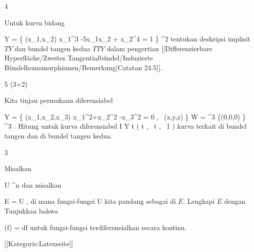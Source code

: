 {4}
{

Untuk kurva bidang

\mavergleichskettedisp
{\vergleichskette
{ Y
}
{ =} { \left\{ (x_1,x_2)  \mid   x_1^3 -5x_1x_2 + x_2^4 = 1         \right\}
}
{ \subset} { \R^2
}
{ } {
}
{ } {
}
}
{}{}{}
tentukan deskripsi implisit
$TY$ dan bundel tangen kedua $TTY$ dalam pengertian
[[Differenzierbare Hyperfläche/Zweites Tangentialbündel/Induzierte Bündelhomomorphismen/Bemerkung|Catatan 24.5]].

}
{} {}

{5 (3+2)}
{

Kita tinjau permukaan diferensiabel

\mavergleichskettedisp
{\vergleichskette
{ Y
}
{ =} { \left\{ (x_1,x_2,x_3)  \mid   x_1^2+x_2^2 -x_3^2 = 0  , \, (x,y,z)        \right\}
}
{ \subseteq} { W
}
{ =} { \R^3 \setminus \{(0,0,0) \}
}
{ \subset} { \R^3
}
}
{}{}{.}
 {Hitung untuk kurva diferensiabel
\maabbeledisp {} { I } { Y
} { t } { \left(  \cos  t   , \,   \sin  t  , \,   1                 \right)
} {}
kurva terkait di bundel tangen dan di bundel tangen kedua.
}

}
{} {}

{3}
{

Misalkan

\mavergleichskette
{\vergleichskette
{ U
}
{ \subseteq }{ \R^n
}
{  }{
}
{    }{
}
{   }{
}
}
{}{}{}
dan misalkan

\mavergleichskette
{\vergleichskette
{ E
}
{ = }{ U \times \R
}
{  }{
}
{    }{
}
{   }{
}
}
{}{}{,}
di mana fungsi-fungsi
 { U } {\R
} {}
kita pandang sebagai
di $E$. Lengkapi $E$ dengan
 Tunjukkan bahwa

\mavergleichskette
{\vergleichskette
{ \nabla (f)
}
{ = }{ df
}
{  }{
}
{    }{
}
{   }{
}
}
{}{}{}
untuk fungsi-fungsi terdiferensialkan secara kontinu.

}
{} {}

 [[Kategorie:Latexseite]]
